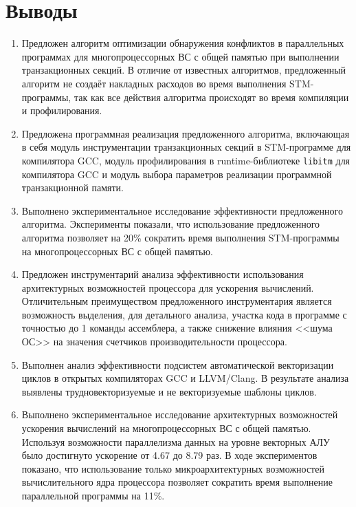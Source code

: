 \section{Выводы}
\begin{enumerate}
\item Предложен алгоритм оптимизации обнаружения конфликтов в параллельных программах для многопроцессорных ВС с общей памятью при выполнении транзакционных секций. В отличие от известных алгоритмов, предложенный алгоритм не создаёт накладных расходов во время выполнения STM-программы, так как все действия алгоритма происходят во время компиляции и профилирования.
\item Предложена программная реализация предложенного алгоритма, включающая в себя модуль инструментации транзакционных секций в STM-программе для компилятора GCC, модуль профилирования в runtime-библиотеке \texttt{libitm} для компилятора GCC и модуль выбора параметров реализации программной транзакционной памяти.
\item Выполнено экспериментальное исследование эффективности предложенного алгоритма. Эксперименты показали, что использование предложенного алгоритма позволяет на 20\% сократить время выполнения STM-программы на многопроцессорных ВС с общей памятью.
\item Предложен инструментарий анализа эффективности использования архитектурных возможностей процессора для ускорения вычислений. Отличительным преимуществом предложенного инструментария является возможность выделения, для детального анализа, участка кода в программе с точностью до 1 команды ассемблера, а также снижение влияния <<шума ОС>> на значения счетчиков производительности процессора.
\item Выполнен анализ эффективности подсистем автоматической векторизации циклов в открытых компиляторах GCC и LLVM/Clang. В результате анализа выявлены трудновекторизуемые и не векторизуемые шаблоны циклов.
\item Выполнено экспериментальное исследование архитектурных возможностей ускорения вычислений на многопроцессорных ВС с общей памятью. Используя возможности параллелизма данных на уровне векторных АЛУ было достигнуто ускорение от 4.67 до 8.79 раз. В ходе экспериментов показано, что использование только микроархитектурных возможностей вычислительного ядра процессора позволяет сократить время выполнение параллельной программы на 11\%.
\end{enumerate}


